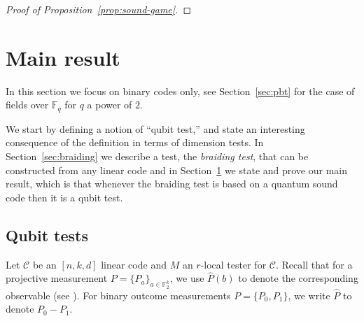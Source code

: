 \documentclass[11pt]{article}
\theoremstyle{definition}
\newcommand{\code}{\mathcal{C}}
\DeclareMathOperator*{\Expectation}{\mathbb{E}}
\newcommand{\Es}[1]{\Expectation_{#1}}
\newcommand{\field}{\mathbb{F}_2}
\newcommand{\F}{\ensuremath{\mathbb{F}}}
\newcommand{\mM}{\ensuremath{\mathcal{M}}}
\newcommand{\mN}{\mathcal{N}}
\begin{document}
\begin{proof}[Proof of Proposition~\ref{prop:sound-game}]
\end{proof}




\section{Main result}
\label{sec:main}

In this section we focus on binary codes only, see Section~\ref{sec:pbt} for the case of fields over $\F_q$ for $q$ a power of $2$. 

We start by defining a notion of ``qubit test,'' and state an interesting consequence of the definition in terms of dimension tests. In Section~\ref{sec:braiding} we describe a test, the \emph{braiding test}, that can be constructed from any linear code and in Section~\ref{sec:main} we state and prove our main result, which is that whenever the braiding test is based on a quantum sound code then it is a qubit test. 

\subsection{Qubit tests}

Let $\code$ be an $[n,k,d]$ linear code and $M$ an $r$-local tester for $\code$. Recall that for a projective measurement $P = \{P_a\}_{a \in \F_2^k}$, we use $\widehat{P}(b)$ to denote the corresponding observable (see ). For binary outcome measurements $P = \{ P_0, P_1\}$, we write $\widehat{P}$ to denote $P_0 - P_1$. 
\end{document}
